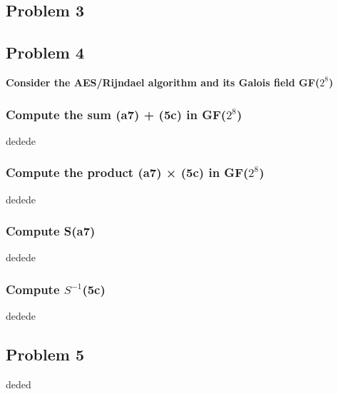 \documentclass[11pt]{article}
\begin{document}
\subsection{Problem 3}

\subsection{Problem 4}
\textbf{Consider the AES/Rijndael algorithm and its Galois field GF($2^{8}$)}
\subsubsection{Compute the sum (a7) + (5c) in GF($2^{8}$)}
dedede
\subsubsection{Compute the product (a7) × (5c) in GF($2^{8}$)}
dedede
\subsubsection{Compute S(a7)}
dedede
\subsubsection{Compute $S^{-1}$(5c)}
dedede
\subsection{Problem 5}

deded
\end{document}
